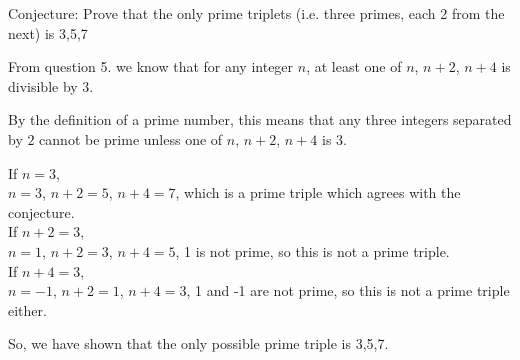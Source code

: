 \documentclass[a4paper]{article}
\begin{document}
Conjecture: Prove that the only prime triplets (i.e. three primes, each 2 from the next) is 3,5,7

From question 5. we know that for any integer $n$, at least one of $n$, $n+2$, $n+4$ is divisible by
3.

By the definition of a prime number, this means that any three integers separated by $2$ cannot be
prime unless one of $n$, $n+2$, $n+4$ is $3$.

If $n = 3$,\\
$n=3$, $n+2=5$, $n+4=7$, which is a prime triple which agrees with the conjecture.\\
If $n+2 = 3$,\\
$n=1$, $n+2=3$, $n+4=5$, 1 is not prime, so this is not a prime triple.\\
If $n+4 = 3$,\\
$n=-1$, $n+2=1$, $n+4=3$, 1 and -1 are not prime, so this is not a prime triple either.

So, we have shown that the only possible prime triple is 3,5,7.
\end{document}
